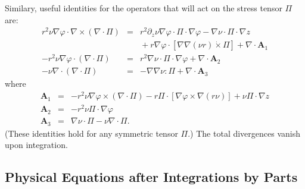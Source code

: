 \documentclass[letterpaper]{book}
\renewcommand{\vec}[1]{\ensuremath{\mathbf{#1}}}
\newcommand{\tensor}[1]{\mathsf{#1}}
\newcommand{\tor}{\varphi}              %
\renewcommand{\P}{\tensor{\Pi}}
\newcommand{\grad}[1]{\nabla #1}
\renewcommand{\div}[1]{\nabla \cdot #1}
\newcommand{\curl}[1]{\nabla \times #1}
\newcommand{\dotdot}{:}
\newcommand{\dottimes}{\dot\times}
\begin{document}
Similary, useful identities for the operators that will act on the
stress tensor $\P$ are:
\begin{subequations}
\label{eq:tensor_identities}
\begin{eqnarray}
  r^2 \nu \grad{\tor} \cdot \curl{(\div{\P})} & = & 
  r^2 \partial_z \nu \grad{\tor} \cdot \P \cdot \grad{\tor}
  - \grad{\nu} \cdot \P \cdot \grad{z}
  \\ && \mbox{}
  + r \grad{\tor} \cdot \left[\grad{\grad{(\nu r)}} \dottimes \P\right]
  + \div{ \vec{A}_1 }\nonumber
  \\
  -r^2 \nu \grad{\tor} \cdot (\div{\P}) & = &
  r^2 \grad{\nu} \cdot \P \cdot \grad{\tor}
  + \div{\vec{A}_2}
  \\
  -\nu \div{(\div{\P})} & = & -\grad{\grad{\nu}} \dotdot \P + \div{\vec{A}_3}
\end{eqnarray}
\end{subequations}
where
\begin{eqnarray*} 
  \vec{A}_1 & = & 
  - r^2 \nu \grad{\tor} \times (\div{\P})
  - r \P \cdot \left[ \grad{\tor} \times \grad{(r \nu)} \right]
  + \nu \P \cdot \grad{z}
  \\
  \vec{A}_2 & = & -r^2 \nu \P \cdot \grad{\tor}
  \\
  \vec{A}_3 & = & \grad{\nu} \cdot \P - \nu \div{\P}.
\end{eqnarray*}
(These identities hold for any symmetric tensor $\P$.)  The total
divergences vanish upon integration.

\subsection{Physical Equations after Integrations by Parts}
\end{document}
